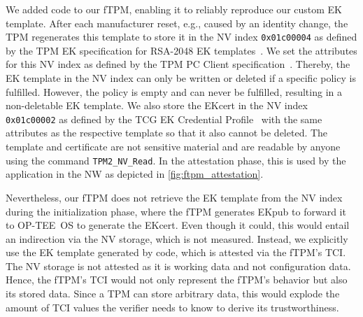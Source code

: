 We added code to our \ac{fTPM}, enabling it to reliably reproduce our custom EK template.
After each manufacturer reset, e.g., caused by an identity change, the TPM regenerates this template to store it in the NV index \texttt{0x01c00004} as defined by the TPM EK specification for RSA-2048 EK templates~\cite{tcg-ek}.
We set the attributes for this NV index as defined by the TPM PC Client specification~\cite{tcgPcClientTpmProfile}. %
Thereby, the EK template in the NV index can only be written or deleted if a specific policy is fulfilled.
However, the policy is empty and can never be fulfilled, resulting in a non-deletable EK template.
We also store the EKcert in the NV index \texttt{0x01c00002} as defined by the TCG EK Credential Profile~\cite{tcg-ek} with the same attributes as the respective template so that it also cannot be deleted.
The template and certificate are not sensitive material and are readable by anyone using the command \texttt{TPM2\_NV\_Read}.
In the attestation phase, this is used by the application in the \ac{NW} as depicted in \autoref{fig:ftpm_attestation}.

Nevertheless, our \ac{fTPM} does not retrieve the EK template from the NV index during the initialization phase, where the \ac{fTPM} generates EKpub to forward it to OP-TEE~OS to generate the EKcert.
Even though it could, this would entail an indirection via the NV storage, which is not measured.
Instead, we explicitly use the EK template generated by code, which is attested via the fTPM's \ac{TCI}\@.
The NV storage is not attested as it is working data and not configuration data.
Hence, the fTPM's \ac{TCI} would not only represent the fTPM's behavior but also its stored data.
Since a \ac{TPM} can store arbitrary data, this would explode the amount of TCI values the verifier needs to know to derive its trustworthiness.



